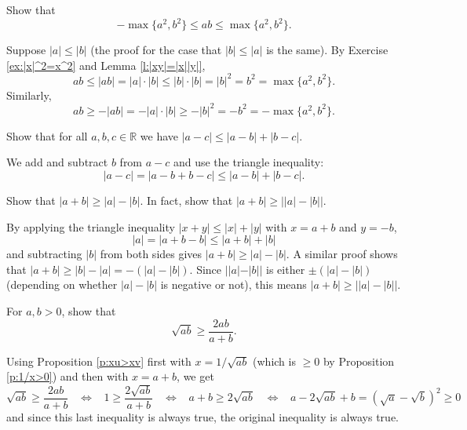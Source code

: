 \documentclass[11pt,dvipsnames]{book}
\numberwithin{equation}{section} %
\numberwithin{figure}{section} %
\numberwithin{table}{section} %
\begin{document}
\begin{exercise}
Show that 
\[
-\max\{a^2,b^2\}\leq ab\leq \max\{a^2,b^2\}.
\]

\begin{solution}
Suppose $|a|\leq |b|$ (the proof for the case that $|b|\leq |a|$ is the same). 
By Exercise \ref{ex:|x|^2=x^2} and Lemma \ref{l:|xy|=|x||y|},
\[
ab\leq |ab|=|a|\cdot|b|\leq |b|\cdot |b|=|b|^2=b^2= \max\{a^2,b^2\}.
\]
Similarly, 
\[
ab\geq -|ab|=-|a|\cdot |b| \geq -|b|^2=-b^2=- \max\{a^2,b^2\}.
\]

\end{solution}
\end{exercise}


\begin{exercise}
Show that for all $a,b,c\in\mathbb{R}$ we have  $|a-c|\leq |a-b|+|b-c|$.
\begin{solution}
We add and subtract $b$ from $a-c$ and use the triangle inequality:
\[
|a-c|=|a-b+b-c|\leq |a-b|+|b-c|.
\]
\end{solution}
\end{exercise}

\begin{exercise} Show that $|a+b|\geq |a|-|b|$. In fact, show that $|a+b|\geq \left||a|-|b|\right|$. 
\end{exercise}

\begin{solution}
By applying the triangle inequality $|x+y|\leq |x|+|y|$ with $x=a+b$ and $y=-b$,
\[
|a|=|a+b-b|\leq |a+b|+|b|
\]
and subtracting $|b|$ from both sides gives $|a+b|\geq |a|-|b|$. A similar proof shows that $|a+b|\geq |b|-|a|=-(|a|-|b|)$. Since $||a|-|b||$ is either $\pm (|a|-|b|)$ (depending on whether $|a|-|b|$ is negative or not), this means $|a+b|\geq \left||a|-|b|\right|$.
\end{solution}


\begin{exercise} For $a,b>0$, show that
\[
\sqrt{ab}\geq \frac{2ab}{a+b}.
\]

\begin{solution}
Using Proposition \ref{p:xu>xv} first with $x=1/\sqrt{ab}$ (which is $\geq 0$ by Proposition \ref{p:1/x>0}) and then with $x=a+b$, we get 
\[
\sqrt{ab}\geq \frac{2ab}{a+b} \;\; \; \Longleftrightarrow \;\;\; 
1\geq \frac{2\sqrt{ab}}{a+b}
\;\; \; \Longleftrightarrow \;\;\; a+b\geq 2\sqrt{ab}
\;\; \; \Longleftrightarrow \;\;\; 
a-2\sqrt{ab}+b=(\sqrt{a}-\sqrt{b})^{2}\geq 0
\]
and since this last inequality is always true, the original inequality is always true. 

\end{solution}


\end{exercise}
\end{document}

